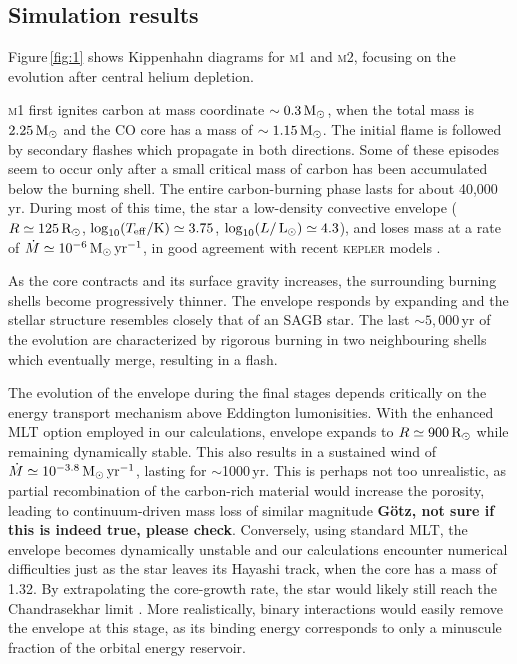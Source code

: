 \documentclass[twocolumn,tighten,times]{aastex62}
\begin{document}
\subsection{Simulation results}
Figure\,\ref{fig:1} shows Kippenhahn diagrams for 
 \textsc{m1} and \textsc{m2}, focusing on the evolution after central helium depletion.

\textsc{m1} first ignites carbon at mass coordinate $\sim 0.3\mathrm{\,M_\odot}$, when the total mass  is $ 2.25\mathrm{\,M_\odot}$ and the CO core has a mass of $\sim 1.15\mathrm{\,M_\odot}$.  
The initial flame is followed by secondary flashes which propagate in both 
directions. Some of these episodes seem to occur only after a small critical 
mass of carbon has been accumulated below the burning shell. The entire carbon-burning phase lasts for about 
40,000\,yr. During most of this time, the star  a low-density convective envelope  
($R\simeq 125\mathrm{\,R_\odot}$, $\log_{10} (T_{\mathrm{eff}} /\mathrm{K})\simeq 3.75$, $\log_{10} (L/\mathrm{\,L_\odot})\simeq 
4.3$), and loses mass at a rate of  
$\dot{M}\simeq10^{-6}\mathrm{\,M_{\odot}\,yr^{-1}}$, in good agreement with 
recent \textsc{kepler} models \citep{Woosley:2019sdf}. 

As the core contracts and its surface gravity increases, the surrounding burning shells become progressively thinner. The envelope responds by expanding  and the stellar structure resembles closely that of an SAGB star.
The last $\sim 5,000$\,yr of the evolution are characterized by rigorous burning in two neighbouring shells which eventually merge, resulting in a  flash.

The evolution of the envelope during the final stages 
depends critically on the energy transport mechanism above Eddington lumonisities. With the enhanced MLT option 
employed in our calculations,   envelope  expands to $R\simeq 900\mathrm{\,R_\odot}$ while remaining dynamically stable. 
This also results in a sustained wind of $\dot{M}\simeq10^{-3.8}\mathrm{\,M_{\odot}\,yr^{-1}}$, lasting for $\sim$1000\,yr. 
This  is perhaps not too unrealistic, as partial recombination of the carbon-rich  material would increase the porosity, leading to continuum-driven mass loss of similar magnitude \citep[e.g.][]{Owocki:2004zz} {\bf G\"{o}tz, not sure if this is indeed true, please check}. 
Conversely, using standard MLT, the envelope becomes dynamically unstable and our calculations encounter numerical difficulties just as the star leaves its Hayashi track, when the core has a mass of 1.32\msun.
By extrapolating the core-growth rate, the star would likely still reach the  Chandrasekhar limit \citep[see ][for a similar conclusion]{Woosley:2019sdf}. 
More realistically, binary interactions would easily remove the envelope at this stage, as its binding energy corresponds to only a minuscule fraction of the orbital energy reservoir. 
\end{document}
